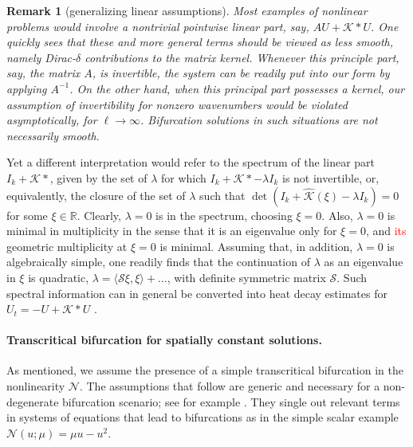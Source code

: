 \documentclass[10pt]{article}
\newtheorem{Remark}[Lemma]{Remark}
\newcommand{\R}{\mathbb{R}}
\newcommand{\Nl}{\mathcal{N}}
\newcommand{\K}{\mathcal{K}}
\begin{document}
\begin{Remark}[generalizing linear assumptions]\label{r:gl}
Most examples of nonlinear problems would involve a nontrivial pointwise linear part, say, $AU+\K*U$. One quickly sees that these and more general terms should be viewed as less smooth, namely Dirac-$\delta$ contributions to the matrix kernel. Whenever this principle part, say, the matrix $A$, is invertible, the system can be readily put into our form by applying $A^{-1}$. On the other hand, when this principal part possesses a kernel, our assumption of invertibility for nonzero wavenumbers would be violated asymptotically, for $\ell\to\infty$. Bifurcation solutions in such situations are not necessarily smooth. 
\end{Remark}

%
Yet a different interpretation would refer to the spectrum of the linear part $I_k + \K*$, given by the set of $\lambda$ for which $I_k + \K*-\lambda I_k$ is not invertible, or, equivalently, the  closure of the set of $\lambda$ such that $\det(I_k+\widehat{\K}(\xi)-\lambda I_k)= 0$ for some $\xi\in\R$. Clearly, $\lambda=0$ is in the spectrum, choosing $\xi=0$. Also, $\lambda=0$ is minimal in multiplicity in the sense that it is an eigenvalue only for $\xi=0$, and \textcolor{red}{its} geometric multiplicity at $\xi=0$ is minimal. Assuming that, in addition, $\lambda=0$ is algebraically simple, one readily finds that the continuation of $\lambda$ as an eigenvalue in $\xi$ is quadratic, $\lambda= \langle \mathcal{S}\xi,\xi\rangle+\ldots$, with definite symmetric matrix  $\mathcal{S}$. Such spectral information can in general be converted into heat decay estimates for $U_t=-U+\K*U$ \cite{heatnl}.


\paragraph{Transcritical bifurcation for spatially constant solutions.}
As mentioned, we assume the presence of a simple transcritical bifurcation in the nonlinearity $\Nl$. The assumptions that follow are generic and necessary for a non-degenerate bifurcation scenario; see for example \cite{chowhale}.  They single out relevant terms in systems of equations that lead to bifurcations as in the simple scalar example $\Nl(u;\mu)=\mu u - u^2$. 
 
\end{document}
